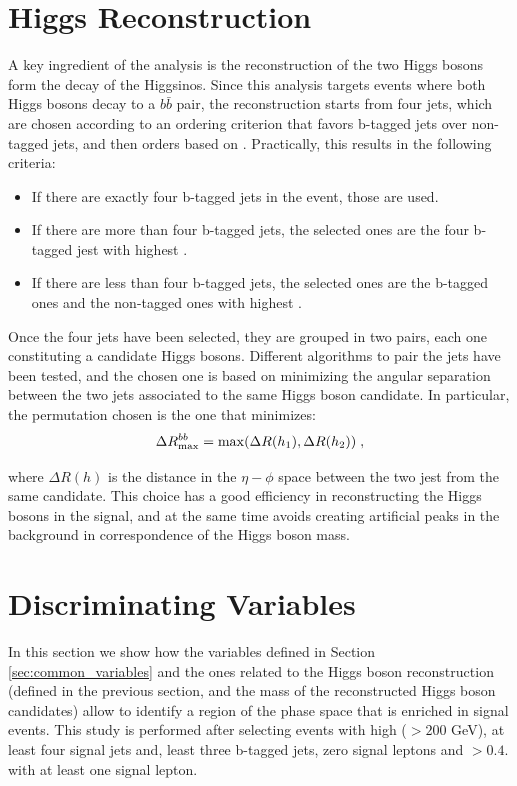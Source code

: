 \section{Higgs Reconstruction}

A key ingredient of the analysis is the reconstruction of the two Higgs bosons form the decay of the Higgsinos.
Since this analysis targets events where both Higgs bosons decay to a $b\bar{b}$ pair, the reconstruction starts 
from four jets, which are chosen according to an ordering criterion that favors b-tagged jets over non-tagged jets,
and then orders based on \pt. Practically, this results in the following criteria:
\begin{itemize}
\item If there are exactly four b-tagged jets in the event, those are used.
\item If there are more than four b-tagged jets, the selected ones are the four b-tagged jest with highest \pt.
\item If there are less than four b-tagged jets, the selected ones are the b-tagged ones and the non-tagged ones with highest \pt.
\end{itemize} 

Once the four jets have been selected, they are grouped in two pairs, each one constituting a candidate Higgs bosons. 
Different algorithms to pair the jets have been tested, and the chosen one is based on minimizing the angular separation 
between the two jets associated to the same Higgs boson candidate. 
In particular, the permutation chosen is the one that minimizes:
\begin{equation}
\Delta R_{\mathrm{max}}^{bb} = \mathrm{max}(\Delta R(h_1), \Delta R(h_2)) \; ,
\end{equation}

\noindent where $\Delta R(h)$ is the distance in the $\eta-\phi$ space between the two jest from the same candidate.
This choice has a good efficiency in reconstructing the Higgs bosons in the signal, 
and at the same time avoids creating artificial peaks in the background in correspondence of the Higgs boson mass. 


\section{Discriminating Variables}

In this section we show how the variables defined in Section \ref{sec:common_variables} and the ones related
to the Higgs boson reconstruction (\dRmax defined in the previous section, and the mass of the reconstructed Higgs boson candidates)
allow to identify a region of the phase space that is enriched in signal events. 
This study is performed after selecting events with high \met ($> 200$ GeV), at least four signal jets and, least three b-tagged jets, zero signal leptons and \dphimin $>0.4$.
with at least one signal lepton.

